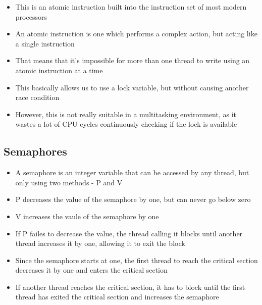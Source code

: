 \begin{itemize}
  \item This is an atomic instruction built into the instruction set of most modern processors
  \item An atomic instruction is one which performs a complex action, but acting like a single instruction
  \item That means that it's impossible for more than one thread to write using an atomic instruction at a time
  \item This basically allows us to use a lock variable, but without causing another race condition
  \item However, this is not really suitable in a multitasking environment, as it wastes a lot of CPU cycles continuously checking if the lock is available
\end{itemize}

\subsection*{Semaphores}

\begin{itemize}
  \item A semaphore is an integer variable that can be accessed by any thread, but only using two methods - P and V
  \item P decreases the value of the semaphore by one, but can never go below zero
  \item V increases the vaule of the semaphore by one
  \item If P failes to decrease the value, the thread calling it blocks until another thread increases it by one, allowing it to exit the block
  \item Since the semaphore starts at one, the first thread to reach the critical section decreases it by one and enters the critical section
  \item If another thread reaches the critical section, it has to block until the first thread has exited the critical section and increases the semaphore
\end{itemize}